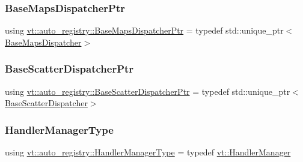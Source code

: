 \mbox{\label{namespacevt_1_1auto__registry_aacf403872e2d1ae4d749738c02904c01}} 
\subsubsection{\texorpdfstring{Base\+Maps\+Dispatcher\+Ptr}{BaseMapsDispatcherPtr}}
{\footnotesize\ttfamily using \hyperlink{namespacevt_1_1auto__registry_aacf403872e2d1ae4d749738c02904c01}{vt\+::auto\+\_\+registry\+::\+Base\+Maps\+Dispatcher\+Ptr} = typedef std\+::unique\+\_\+ptr$<$\hyperlink{structvt_1_1auto__registry_1_1_base_maps_dispatcher}{Base\+Maps\+Dispatcher}$>$}

\mbox{\label{namespacevt_1_1auto__registry_aba7be4c573c0f1361c024e4d3293a62a}} 
\subsubsection{\texorpdfstring{Base\+Scatter\+Dispatcher\+Ptr}{BaseScatterDispatcherPtr}}
{\footnotesize\ttfamily using \hyperlink{namespacevt_1_1auto__registry_aba7be4c573c0f1361c024e4d3293a62a}{vt\+::auto\+\_\+registry\+::\+Base\+Scatter\+Dispatcher\+Ptr} = typedef std\+::unique\+\_\+ptr$<$\hyperlink{structvt_1_1auto__registry_1_1_base_scatter_dispatcher}{Base\+Scatter\+Dispatcher}$>$}

\mbox{\label{namespacevt_1_1auto__registry_a6014637a7590cbfcd2884a23c3e5b576}} 
\subsubsection{\texorpdfstring{Handler\+Manager\+Type}{HandlerManagerType}}
{\footnotesize\ttfamily using \hyperlink{namespacevt_1_1auto__registry_a6014637a7590cbfcd2884a23c3e5b576}{vt\+::auto\+\_\+registry\+::\+Handler\+Manager\+Type} = typedef \hyperlink{structvt_1_1_handler_manager}{vt\+::\+Handler\+Manager}}

